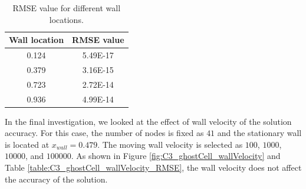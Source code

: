 \begin{table}[H]
\centering
\begin{tabular}{c | c}
	 Wall location & RMSE value \\ \hline \hline
	 0.124 & 5.49E-17 \\ \hline
	 0.379 & 3.16E-15 \\ \hline
	 0.723 & 2.72E-14 \\ \hline
	 0.936 & 4.99E-14
\end{tabular}
\caption{RMSE value for different wall locations.}
\label{table:C3_ghostCell_wallLocation_RMSE}
\end{table}

In the final investigation, we looked at the effect of wall velocity of the solution accuracy. For this case, the number of nodes is fixed as $41$ and the stationary wall is located at $x_{wall} = 0.479$. The moving wall velocity is selected as $100$, $1000$, $10000$, and $100000$. As shown in Figure \ref{fig:C3_ghostCell_wallVelocity} and Table \ref{table:C3_ghostCell_wallVelocity_RMSE}, the wall velocity does not affect the accuracy of the solution.

